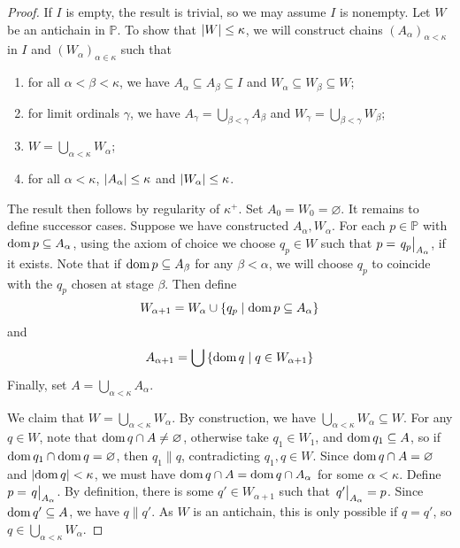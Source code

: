 \begin{proof}
    If \( I \) is empty, the result is trivial, so we may assume \( I \) is nonempty.
    Let \( W \) be an antichain in \( \mathbb P \).
    To show that \( \abs{W} \leq \kappa \), we will construct chains \( (A_\alpha)_{\alpha < \kappa} \) in \( I \) and \( (W_\alpha)_{\alpha \in \kappa} \) such that
    \begin{enumerate}
        \item for all \( \alpha < \beta < \kappa \), we have \( A_\alpha \subseteq A_\beta \subseteq I \) and \( W_\alpha \subseteq W_\beta \subseteq W \);
        \item for limit ordinals \( \gamma \), we have \( A_\gamma = \bigcup_{\beta < \gamma} A_\beta \) and \( W_\gamma = \bigcup_{\beta < \gamma} W_\beta \);
        \item \( W = \bigcup_{\alpha < \kappa} W_\alpha \);
        \item for all \( \alpha < \kappa \), \( \abs{A_\alpha} \leq \kappa \) and \( \abs{W_\alpha} \leq \kappa \).
    \end{enumerate}
    The result then follows by regularity of \( \kappa^+ \).
    Set \( A_0 = W_0 = \varnothing \).
    It remains to define successor cases.
    Suppose we have constructed \( A_\alpha, W_\alpha \).
    For each \( p \in \mathbb P \) with \( \operatorname{dom} p \subseteq A_\alpha \), using the axiom of choice we choose \( q_p \in W \) such that \( p = \eval{q_p}_{A_\alpha} \), if it exists.
    Note that if \( \operatorname{dom} p \subseteq A_\beta \) for any \( \beta < \alpha \), we will choose \( q_p \) to coincide with the \( q_p \) chosen at stage \( \beta \).
    Then define
    \[ W_{\alpha + 1} = W_\alpha \cup \qty{q_p \mid \operatorname{dom}p \subseteq A_\alpha} \]
    and
    \[ A_{\alpha + 1} = \bigcup \qty{\operatorname{dom}q \mid q \in W_{\alpha + 1}} \]
    Finally, set \( A = \bigcup_{\alpha < \kappa} A_\alpha \).

    We claim that \( W = \bigcup_{\alpha < \kappa} W_\alpha \).
    By construction, we have \( \bigcup_{\alpha < \kappa} W_\alpha \subseteq W \).
    For any \( q \in W \), note that \( \operatorname{dom} q \cap A \neq \varnothing \), otherwise take \( q_1 \in W_1 \), and \( \operatorname{dom} q_1 \subseteq A \), so if \( \operatorname{dom} q_1 \cap \operatorname{dom} q = \varnothing \), then \( q_1 \mathrel\| q \), contradicting \( q_1, q \in W \).
    Since \( \operatorname{dom} q \cap A = \varnothing \) and \( \abs{\operatorname{dom} q} < \kappa \), we must have \( \operatorname{dom} q \cap A = \operatorname{dom} q \cap A_\alpha \) for some \( \alpha < \kappa \).
    Define \( p = \eval{q}_{A_\alpha} \).
    By definition, there is some \( q' \in W_{\alpha + 1} \) such that \( \eval{q'}_{A_\alpha} = p \).
    Since \( \operatorname{dom} q' \subseteq A \), we have \( q \mathrel\| q' \).
    As \( W \) is an antichain, this is only possible if \( q = q' \), so \( q \in \bigcup_{\alpha < \kappa} W_\alpha \).


\end{proof}
